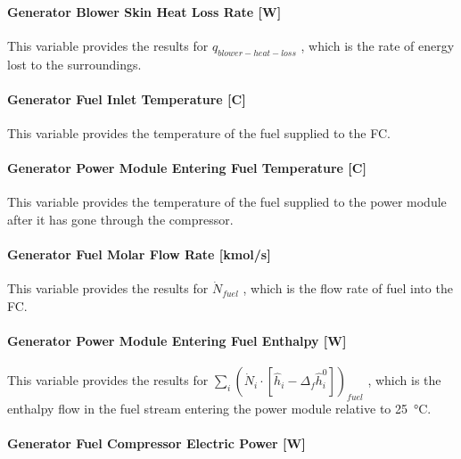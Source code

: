 \paragraph{Generator Blower Skin Heat Loss Rate {[}W{]}}\label{generator-blower-skin-heat-loss-rate-w}

This variable provides the results for \({q_{blower - heat - loss}}\) , which is the rate of energy lost to the surroundings.

\paragraph{Generator Fuel Inlet Temperature {[}C{]}}\label{generator-fuel-inlet-temperature-c}

This variable provides the temperature of the fuel supplied to the FC.

\paragraph{Generator Power Module Entering Fuel Temperature {[}C{]}}\label{generator-power-module-entering-fuel-temperature-c}

This variable provides the temperature of the fuel supplied to the power module after it has gone through the compressor.

\paragraph{Generator Fuel Molar Flow Rate {[}kmol/s{]}}\label{generator-fuel-molar-flow-rate-kmols-1}

This variable provides the results for \({\dot N_{fuel}}\) , which is the flow rate of fuel into the FC.

\paragraph{Generator Power Module Entering Fuel Enthalpy {[}W{]}}\label{generator-power-module-entering-fuel-enthalpy-w}

This variable provides the results for \({\sum\limits_i {\left( {{{\dot N}_i} \cdot \left[ {{{\hat h}_i} - {\Delta_f}\hat h_i^0} \right]} \right)}_{fuel}}\) , which is the enthalpy flow in the fuel stream entering the power module relative to \SI{25}{\celsius}.

\paragraph{Generator Fuel Compressor Electric Power {[}W{]}}\label{generator-fuel-compressor-electric-power-w}

